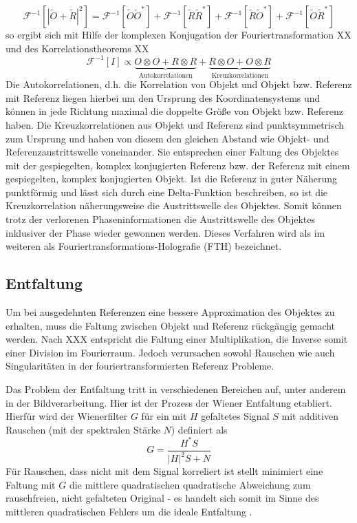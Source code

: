 \begin{equation}
	\mathscr{F}^{-1}\left[\left|\tilde{O}+\tilde{R}\right|^2\right]=
	\mathscr{F}^{-1}\left[\tilde{O}\tilde{O}^*\right]+
	\mathscr{F}^{-1}\left[\tilde{R}\tilde{R}^*\right]+
	\mathscr{F}^{-1}\left[\tilde{R}\tilde{O}^*\right]+
	\mathscr{F}^{-1}\left[\tilde{O}\tilde{R}^*\right]
\end{equation}
so ergibt sich mit Hilfe der komplexen Konjugation der Fouriertransformation XX und des Korrelationstheorems XX
\begin{equation}
	\mathscr{F}^{-1}[I]\propto \underbrace{O \otimes O + R\otimes R}_{\text{Autokorrelationen}}+\underbrace{R\otimes O+ O\otimes R}_{\text {Kreuzkorrelationen}}
\end{equation}
Die Autokorrelationen, d.h. die Korrelation von Objekt und Objekt bzw. Referenz mit Referenz liegen hierbei um den Ursprung des Koordinatensystems und können in jede Richtung maximal die doppelte Größe von Objekt bzw. Referenz haben. Die Kreuzkorrelationen aus Objekt und Referenz sind punktsymmetrisch zum Ursprung und haben von diesem den gleichen Abstand wie Objekt- und Referenzaustrittswelle voneinander.
Sie  entsprechen einer Faltung des Objektes mit der gespiegelten, komplex konjugierten Referenz bzw. der Referenz mit einem gespiegelten, komplex konjugierten Objekt.  Ist die Referenz in guter Näherung punktförmig und lässt sich durch eine Delta-Funktion beschreiben, so ist die Kreuzkorrelation näherungsweise die Austrittswelle des Objektes. Somit können trotz der verlorenen Phaseninformationen die Austrittswelle des Objektes inklusiver der Phase wieder gewonnen werden. Dieses Verfahren wird als im weiteren als Fouriertransformations-Holografie (FTH) bezeichnet.
\subsection{Entfaltung}
Um bei ausgedehnten Referenzen eine bessere Approximation des Objektes zu erhalten, muss die Faltung zwischen Objekt und Referenz rückgängig gemacht werden. Nach  XXX entspricht die Faltung einer Multiplikation, die Inverse somit einer Division im Fourierraum. Jedoch verursachen sowohl Rauschen wie auch Singularitäten in der fouriertransformierten Referenz Probleme.

Das Problem der Entfaltung tritt in verschiedenen Bereichen auf, unter anderem in der Bildverarbeitung.
Hier ist der Prozess der Wiener Entfaltung etabliert. Hierfür wird der Wienerfilter $G$ für ein mit $H$ gefaltetes Signal $S$ mit additiven Rauschen (mit der spektralen Stärke $N$) definiert als
\begin{equation}
	G=\frac{H^* S}{\left|H\right|^2 S+N}
\end{equation}
Für Rauschen, dass nicht mit dem Signal korreliert ist stellt minimiert eine Faltung mit $G$ die mittlere quadratischen quadratische Abweichung zum rauschfreien, nicht gefalteten Original - es handelt sich somit im Sinne des mittleren quadratischen Fehlers um die ideale Entfaltung \cite{castleman1996}.

